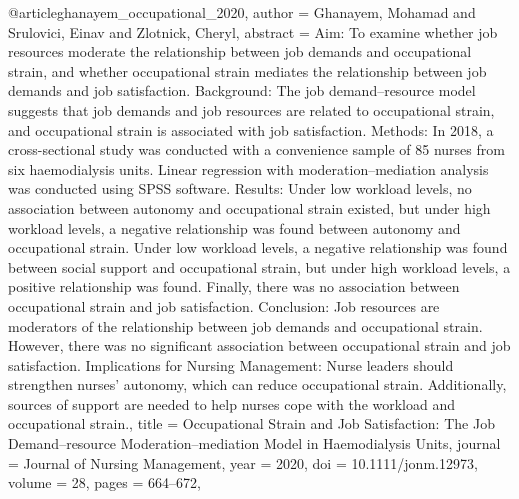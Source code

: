 @article{ghanayem_occupational_2020,
  author = {Ghanayem, Mohamad and Srulovici, Einav and Zlotnick, Cheryl},
  abstract = {Aim: To examine whether job resources moderate the relationship between job demands and occupational strain, and whether occupational strain mediates the relationship between job demands and job satisfaction. Background: The job demand–resource model suggests that job demands and job resources are related to occupational strain, and occupational strain is associated with job satisfaction. Methods: In 2018, a cross-sectional study was conducted with a convenience sample of 85 nurses from six haemodialysis units. Linear regression with moderation–mediation analysis was conducted using SPSS software. Results: Under low workload levels, no association between autonomy and occupational strain existed, but under high workload levels, a negative relationship was found between autonomy and occupational strain. Under low workload levels, a negative relationship was found between social support and occupational strain, but under high workload levels, a positive relationship was found. Finally, there was no association between occupational strain and job satisfaction. Conclusion: Job resources are moderators of the relationship between job demands and occupational strain. However, there was no significant association between occupational strain and job satisfaction. Implications for Nursing Management: Nurse leaders should strengthen nurses' autonomy, which can reduce occupational strain. Additionally, sources of support are needed to help nurses cope with the workload and occupational strain.},
  title = {{Occupational} {Strain} {and} {Job} {Satisfaction}: {The} {Job} {Demand–resource} {Moderation–mediation} {Model} {in} {Haemodialysis} {Units}},
  journal = {Journal of Nursing Management},
  year = {2020},
  doi = {10.1111/jonm.12973},
  volume = {28},
  pages = {664--672},
}

